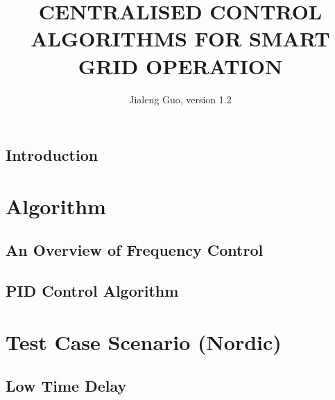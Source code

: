 \documentclass[12pt]{report}
\begin{document}
\title{CENTRALISED CONTROL ALGORITHMS FOR SMART GRID OPERATION}
\author{Jialeng Guo, version 1.2}



\beforepreface
\hypersetup{linkcolor=magenta}

\hypersetup{linkcolor=.}

\afterpreface
\hypersetup{linkcolor=magenta}



\chapter{Introduction}
\label{chapter:intro}





\part{Algorithm}

\chapter{An Overview of Frequency Control}
\label{Chapter2}


\chapter{PID Control Algorithm}
\label{Chapter3}






\part{Test Case Scenario (Nordic)}

\chapter{Low Time Delay}
\label{Chapter4}




\end{document}
